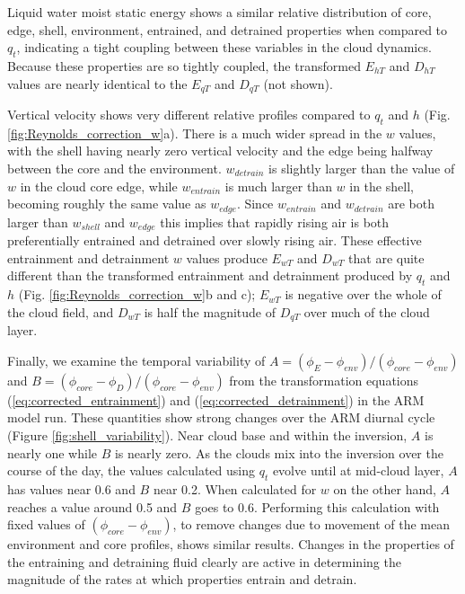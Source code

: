\documentclass[12pt]{article}
\begin{document}
Liquid water moist static energy shows a similar relative distribution of 
core, edge, shell, environment, entrained, and detrained properties when 
compared to $q_t$, indicating a tight coupling between these variables in 
the cloud dynamics.  Because these properties are so tightly coupled, the
transformed $E_{hT}$ and $D_{hT}$ values are nearly identical to the $E_{qT}$ 
and $D_{qT}$ (not shown).

Vertical velocity shows very different relative profiles compared to
$q_t$ and $h$ (Fig. \ref{fig:Reynolds_correction_w}a).  There is a much wider spread in the $w$ values, with the shell having nearly zero vertical velocity 
and the edge being halfway between the core and the environment.  $w_{detrain}$ 
is slightly larger than the value of $w$ in the cloud core edge, while 
$w_{entrain}$ is much larger than $w$ in the shell, becoming roughly the 
same value as $w_{edge}$.  Since $w_{entrain}$ and $w_{detrain}$ are both 
larger than $w_{shell}$ and $w_{edge}$ this implies that rapidly rising air 
is both preferentially entrained and detrained over slowly rising air.
These effective entrainment and detrainment $w$ values produce $E_{wT}$ and 
$D_{wT}$ that are quite different than the transformed entrainment and
detrainment produced by $q_t$ and $h$ (Fig. \ref{fig:Reynolds_correction_w}b 
and c); $E_{wT}$ is negative over the whole of the cloud field, and $D_{wT}$ 
is half the magnitude of $D_{qT}$ over much of the cloud layer.

Finally, we examine the temporal variability of 
$A = (\phi_E - \phi_{env})/(\phi_{core} - \phi_{env})$ and
$B = (\phi_{core} - \phi_D)/(\phi_{core} - \phi_{env})$ from the transformation
equations (\ref{eq:corrected_entrainment}) and (\ref{eq:corrected_detrainment})
in the ARM model run.  These quantities show strong changes over the ARM diurnal
cycle (Figure \ref{fig:shell_variability}).  Near cloud base and within the
inversion, $A$ is nearly one while $B$ is nearly zero.  As the clouds mix 
into the inversion over the course of the day, the values calculated using 
$q_t$ evolve until at mid-cloud layer, $A$ has values near 0.6 and $B$ near 
0.2.  When calculated for $w$ on the other hand, $A$ reaches a value around 
0.5 and $B$ goes to 0.6.  Performing this calculation with fixed values of 
$(\phi_{core} - \phi_{env})$, to remove changes due to movement of the mean
environment and core profiles, shows similar results.  Changes in the 
properties of the entraining and detraining fluid clearly are active in
determining the magnitude of the rates at which properties entrain and detrain.
\end{document}
